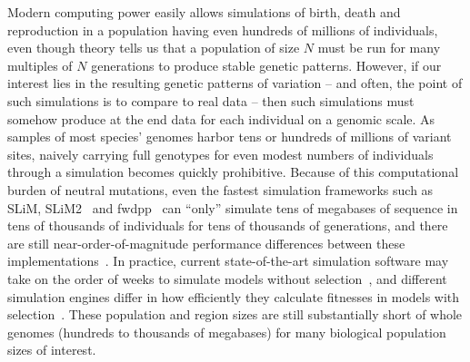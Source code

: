 \documentclass{article}
\begin{document}
Modern computing power easily allows simulations of birth, death and reproduction
in a population having even hundreds of millions of individuals,
even though theory tells us that a population of size $N$
must be run for many multiples of $N$ generations to produce stable genetic patterns.
However, if our interest lies in the resulting genetic patterns of variation
-- and often, the point of such simulations is to compare to real data --
then such simulations must somehow produce at the end data for each individual on a genomic scale.
As samples of most species' genomes harbor tens or hundreds of millions of variant sites,
naively carrying full genotypes for even modest numbers of individuals through a simulation
becomes quickly prohibitive.
Because of this computational burden of neutral mutations, even the fastest simulation frameworks such as SLiM,
SLiM2~\citep{haller2017flexible} and fwdpp~\citep{fwdpp}
can ``only'' simulate tens of megabases of sequence in tens of thousands of individuals
for tens of thousands of generations, and there are still near-order-of-magnitude performance differences between these
implementations~\citep{haller2017flexible}.
In practice, current state-of-the-art simulation software may take on the order of
weeks to simulate models without selection~\citep{fwdpp,Hernandez2015-wf},
and different simulation engines differ in how efficiently they
calculate fitnesses in models with selection~\citep{fwdpp}.
These population and region sizes are still substantially short of whole genomes
(hundreds to thousands of megabases)
for many biological population sizes of interest.
\end{document}
